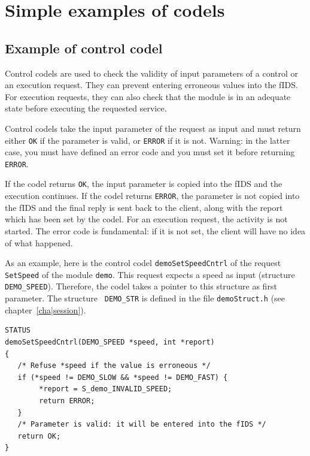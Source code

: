 \section{Simple examples of codels}

\subsection{Example of control codel}
\label{ssec|control|ex}

Control codels are used  to check the  validity of input parameters  of a
control  or  an execution request.    They can prevent entering erroneous
values  into the fIDS. For execution  requests, they can  also check that
the  module  is in   an adequate  state before  executing  the  requested
service.

Control codels take the input parameter of the  request as input and must
return either {\tt OK} if the parameter is valid, or {\tt ERROR} if it is
not. Warning: in the latter case, you must have defined an error code and
you must set it before returning {\tt ERROR}.

If the  codel returns {\tt  OK}, the  input parameter  is copied into the
fIDS and the execution  continues. If the  codel returns {\tt ERROR}, the
parameter is not copied into the fIDS and the final reply is sent back to
the client, along with the report which has been set by the codel. For an
execution  request,  the  activity is  not  started.   The error code  is
fundamental: if it is  not  set, the client   will have no idea  of  what
happened.

As an example, here  is the control  codel {\tt demoSetSpeedCntrl} of  the
request {\tt SetSpeed} of the module {\tt  demo}.  This request expects a
speed as input (structure {\tt DEMO\_SPEED}).  Therefore, the codel takes
a pointer   to  this structure as  first  parameter.   The structure {\tt
DEMO\_STR}  is   defined    in  the    file  {\tt   demoStruct.h}    (see
chapter~\ref{cha|session}).

\begin{center}\begin{cartouche}\small\begin{verbatim}
STATUS
demoSetSpeedCntrl(DEMO_SPEED *speed, int *report)
{
   /* Refuse *speed if the value is erroneous */
   if (*speed != DEMO_SLOW && *speed != DEMO_FAST) {
        *report = S_demo_INVALID_SPEED;
        return ERROR;
   }
   /* Parameter is valid: it will be entered into the fIDS */
   return OK;
}
\end{verbatim}\end{cartouche}\end{center}

